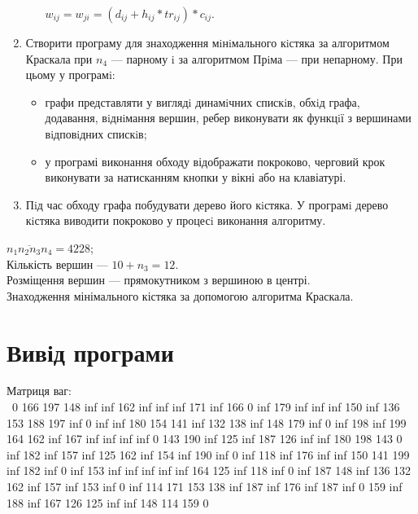 \begin{enumerate}
\begin{enumerate}
        $w_{ij} = w_{ji} = \left(d_{ij} + h_{ij} * tr_{ij}\right) * c_{ij}$.
    \end{enumerate}
  \item Створити програму для знаходження мiнiмального кiстяка за алгоритмом Краскала при $n_4$ — парному i за алгоритмом Прiма — при непарному.
    При цьому у програмi:
    \begin{itemize}
      \item графи представляти у виглядi динамiчних спискiв, обхiд графа, додавання, вiднiмання вершин, ребер виконувати як функцiї з вершинами вiдповiдних спискiв;
      \item у програмі виконання обходу відображати покроково, черговий крок виконувати за натисканням кнопки у вікні або на клавіатурі.
    \end{itemize}
  \item Пiд час обходу графа побудувати дерево його кiстяка. У програмi дерево кiстяка виводити покроково у процесi виконання алгоритму.
\end{enumerate}

\taskspec%
$\overline{n_1 n_2 n_3 n_4} = 4228$;\\
Кількість вершин --- $10 + n_3 = 12$.\\
Розміщення вершин --- прямокутником з вершиною в центрі.\\
Знаходження мінімального кістяка за допомогою алгоритма Краскала.


\section{Вивід програми}

\begin{minipage}[t]{0.7\linewidth}
  \begin{center}
    \begin{framed}
      \noindent%
      Матриця ваг:\\
        {\ttfamily\obeyspaces\obeylines\footnotesize%
         \  0 166 197 148 inf inf 162 inf inf inf 171 inf 
          166   0 inf 179 inf inf inf 150 inf 136 153 188 
          197 inf   0 inf inf 180 154 141 inf 132 138 inf 
          148 179 inf   0 inf 198 inf 199 164 162 inf 167 
          inf inf inf inf   0 143 190 inf 125 inf 187 126 
          inf inf 180 198 143   0 inf 182 inf 157 inf 125 
          162 inf 154 inf 190 inf   0 inf 118 inf 176 inf 
          inf 150 141 199 inf 182 inf   0 inf 153 inf inf 
          inf inf inf 164 125 inf 118 inf   0 inf 187 148 
          inf 136 132 162 inf 157 inf 153 inf   0 inf 114 
          171 153 138 inf 187 inf 176 inf 187 inf   0 159 
          inf 188 inf 167 126 125 inf inf 148 114 159   0 
        }
    \end{framed}
  \end{center}
\end{minipage}
\hfill
\vspace{1em}

